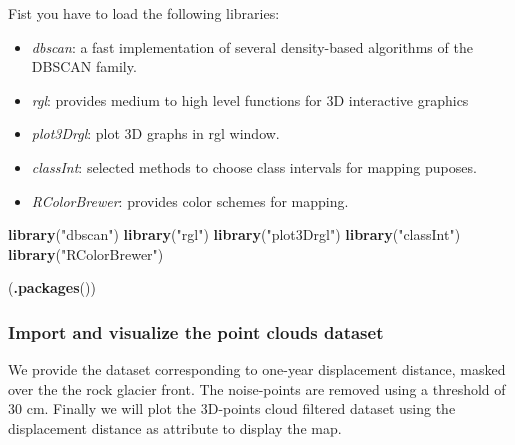 \documentclass[
]{article}
\newenvironment{Shaded}{\begin{snugshade}}{\end{snugshade}}
\newcommand{\FunctionTok}[1]{\textcolor[rgb]{0.13,0.29,0.53}{\textbf{#1}}}
\newcommand{\NormalTok}[1]{#1}
\newcommand{\StringTok}[1]{\textcolor[rgb]{0.31,0.60,0.02}{#1}}
\providecommand{\tightlist}{%
  \setlength{\itemsep}{0pt}\setlength{\parskip}{0pt}}
\begin{document}
Fist you have to load the following libraries:

\begin{itemize}
\tightlist
\item
  \emph{dbscan}: a fast implementation of several density-based algorithms of the DBSCAN family.
\item
  \emph{rgl}: provides medium to high level functions for 3D interactive graphics
\item
  \emph{plot3Drgl}: plot 3D graphs in rgl window.
\item
  \emph{classInt}: selected methods to choose class intervals for mapping puposes.
\item
  \emph{RColorBrewer}: provides color schemes for mapping.
\end{itemize}

\begin{Shaded}
\begin{Highlighting}[]
\FunctionTok{library}\NormalTok{(}\StringTok{"dbscan"}\NormalTok{)}
\FunctionTok{library}\NormalTok{(}\StringTok{"rgl"}\NormalTok{)}
\FunctionTok{library}\NormalTok{(}\StringTok{"plot3Drgl"}\NormalTok{)}
\FunctionTok{library}\NormalTok{(}\StringTok{"classInt"}\NormalTok{)}
\FunctionTok{library}\NormalTok{(}\StringTok{"RColorBrewer"}\NormalTok{)}

\NormalTok{(}\FunctionTok{.packages}\NormalTok{())}
\end{Highlighting}
\end{Shaded}

\subsubsection{Import and visualize the point clouds dataset}\label{import-and-visualize-the-point-clouds-dataset}

We provide the dataset corresponding to one-year displacement distance, masked over the the rock glacier front.
The noise-points are removed using a threshold of 30 cm.
Finally we will plot the 3D-points cloud filtered dataset using the displacement distance as attribute to display the map.
\end{document}
